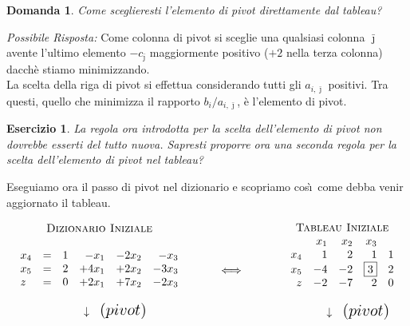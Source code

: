 \documentclass[10pt]{article}
\newtheorem{Dom}{Domanda}%
\newtheorem{Ese}{Esercizio}%
\begin{document}
\begin{Dom}
   Come sceglieresti l'elemento di pivot direttamente dal tableau?
\end{Dom}
{\em Possibile Risposta: \/}
Come colonna di pivot si sceglie
una qualsiasi colonna $\bar{\jmath}$
avente l'ultimo elemento $-c_{\bar{\jmath}}$
maggiormente positivo ($+2$ nella terza colonna)
dacch\`e stiamo minimizzando.\\

La scelta della riga di pivot si effettua
considerando tutti gli $a_{i,\bar{\jmath}}$ positivi.
Tra questi, quello che minimizza il rapporto $b_i/a_{i,\bar{\jmath}}$,
\`e l'elemento di pivot.\\ 

\begin{Ese}
   La regola ora introdotta per la scelta dell'elemento
   di pivot non dovrebbe esserti del tutto nuova.
   Sapresti proporre ora una seconda regola per
   la scelta dell'elemento di pivot nel tableau?
\end{Ese}

Eseguiamo ora il passo di pivot nel dizionario
e scopriamo cos\`\i\ come debba venir
aggiornato il tableau.

\[
   \begin{array}{c}
   \mbox{\sc Dizionario Iniziale}\\ \\
   \begin{array}{lcrrrr}
      x_{4} &=& 1 & -x_1 & -2x_2 & -x_3 \\
      x_{5} &=& 2 & +4x_1 & +2x_2 & -3x_3 \\
         z    &=& 0 & +2x_1 & +7x_2 & -2x_3 \\
   \end{array}\\ \\
       \hspace{1cm} {\Huge \downarrow} {\Large \mbox{ \ $(pivot)$}}
   \end{array}
\hfill
\hspace{1cm}
{\Huge \Longleftrightarrow}
\hfill
\hspace{1.2cm}
   \begin{array}{c}
   \mbox{\sc Tableau Iniziale}\\ 
   \begin{array}{rrrrr}
         & x_1  & x_2 & x_3  \\
      x_4 &  1 &  2 &  1   &  1 \\
      x_5 & -4 & -2 & \fbox{3} &  2 \\
       z  & -2 & -7 &  2   &  0 \\
   \end{array}\\ \\
       \hspace{1cm} {\Huge \downarrow} {\Large \mbox{ \ $(pivot)$}}
   \end{array}
\]
\end{document}
